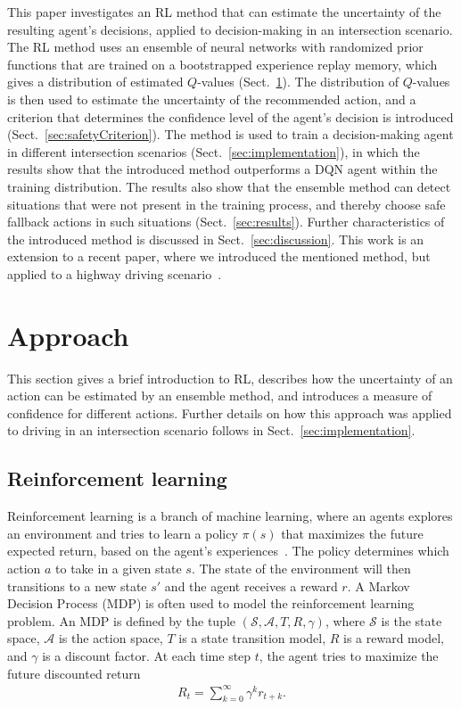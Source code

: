 This paper investigates an RL method that can estimate the uncertainty of the resulting agent's decisions, applied to decision-making in an intersection scenario. The RL method uses an ensemble of neural networks with randomized prior functions that are trained on a bootstrapped experience replay memory, which gives a distribution of estimated $Q$-values (Sect.~\ref{sec:approach}). The distribution of $Q$-values is then used to estimate the uncertainty of the recommended action, and a criterion that determines the confidence level of the agent's decision is introduced (Sect.~\ref{sec:safetyCriterion}). The method is used to train a decision-making agent in different intersection scenarios (Sect.~\ref{sec:implementation}), in which the results show that the introduced method outperforms a DQN agent within the training distribution. The results also show that the ensemble method can detect situations that were not present in the training process, and thereby choose safe fallback actions in such situations (Sect.~\ref{sec:results}).
Further characteristics of the introduced method is discussed in Sect.~\ref{sec:discussion}.
This work is an extension to a recent paper, where we introduced the mentioned method, but applied to a highway driving scenario~\cite{Hoel2020}.

\section{Approach}
\label{sec:approach}
This section gives a brief introduction to RL, describes how the uncertainty of an action can be estimated by an ensemble method, and introduces a measure of confidence for different actions. Further details on how this approach was applied to driving in an intersection scenario follows in Sect.~\ref{sec:implementation}.

\subsection{Reinforcement learning}

Reinforcement learning is a branch of machine learning, where an agents explores an environment and tries to learn a policy $\pi(s)$ that maximizes the future expected return, based on the agent's experiences~\cite{Sutton2018}. The policy determines which action $a$ to take in a given state $s$. The state of the environment will then transitions to a new state $s'$ and the agent receives a reward $r$. A Markov Decision Process (MDP) is often used to model the reinforcement learning problem. An MDP is defined by the tuple $( \mathcal{S}, \mathcal{A}, T, R, \gamma)$, where $\mathcal{S}$ is the state space, $\mathcal{A}$ is the action space, $T$ is a state transition model, $R$ is a reward model, and $\gamma$ is a discount factor. At each time step $t$, the agent tries to maximize the future discounted return
%
\begin{align}
	R_t = \sum_{k=0}^\infty \gamma^k r_{t+k}.
\end{align}

